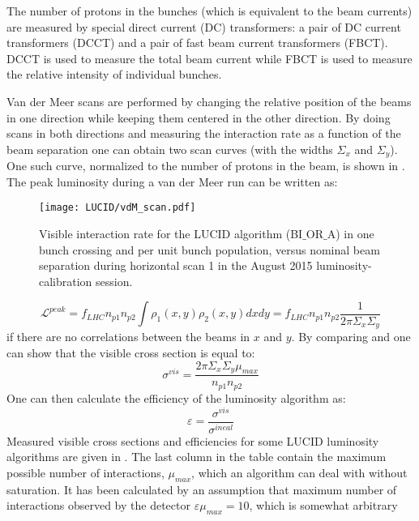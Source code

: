 The number of protons in the bunches (which is equivalent to the beam currents) are measured by special direct current (DC) transformers: 
a pair of DC current transformers (DCCT) and a pair of fast beam current transformers (FBCT). 
DCCT is used to measure the total beam current while FBCT is used to measure the relative intensity of individual bunches.

Van der Meer scans are performed by changing the relative position of the beams in one direction while keeping them centered in the other direction.
By doing scans in both directions and measuring the interaction rate as a function of the beam separation one can obtain two scan curves (with the widths $\Sigma_{x}$ and $\Sigma_{y}$). 
One such curve, normalized to the number of protons in the beam, is shown in .
The peak luminosity during a van der Meer run can be written as:
\begin{figure}
\centering
\texttt{[image: LUCID/vdM\_scan.pdf]}
\caption{Visible interaction rate for the LUCID algorithm (BI$\_$OR$\_$A) in one bunch crossing and per unit bunch population, 
	 versus nominal beam separation during horizontal scan 1 in the August 2015 luminosity-calibration session. }
\label{fig:vdmScanCurve}
\end{figure}
\begin{equation}
\mathscr{L}^{peak} = f_{LHC} n_{p1} n_{p2} \int \rho_{1}(x,y) \rho_{2}(x,y) dx dy =  f_{LHC} n_{p1} n_{p2} \dfrac{1}{2\pi \Sigma_{x} \Sigma_{y}}
\label{eq:lumi_vdm}
\end{equation}
if there are no correlations between the beams in $x$ and $y$.
By comparing  and  one can show that the visible cross section is equal to:
\begin{equation}
\sigma^{vis} = \dfrac{ 2 \pi \Sigma_{x} \Sigma_{y} \mu_{max}  }{ n_{p1} n_{p2} }
\label{eq:sigma_vis}
\end{equation}
One can then calculate the efficiency of the luminosity algorithm as:
\begin{equation}
\varepsilon = \dfrac{\sigma^{vis}}{\sigma^{ineal}}
\label{eq:alg_method_eff}
\end{equation}
Measured visible cross sections and efficiencies for some LUCID luminosity algorithms are given in .
The last column in the table contain the maximum possible number of interactions, $\mu_{max}$, which an algorithm can deal with without saturation.
It has been calculated by an assumption that maximum number of interactions observed by the detector $\varepsilon\mu_{max} = 10$, which is somewhat arbitrary 
